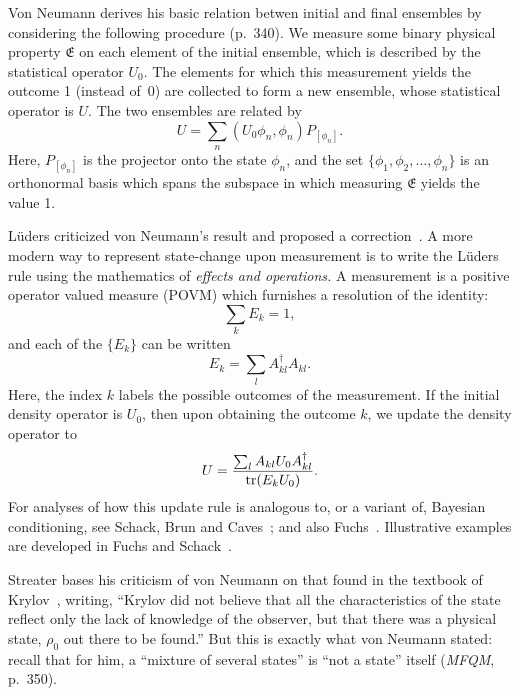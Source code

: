 \documentclass[aps,pra,superscriptaddress,12pt,tightenlines,nofootinbib]{revtex4-2}
\newcommand{\tr}{\hbox{tr}}
\newcommand{\MFQM}{\textsl{MFQM}}
\begin{document}
Von Neumann derives his basic relation betwen initial and final
ensembles by considering the following procedure (p.\ 340).  We
measure some binary physical property $\mathfrak{E}$ on each element of the
initial ensemble, which is described by the statistical operator $U_0$.
The elements for which this measurement yields the outcome 1 (instead
of~0) are collected to form a new ensemble, whose statistical operator
is $U$.  The two ensembles are related by
\begin{equation}
U = \sum_n (U_0 \phi_n, \phi_n) P_{[\phi_n]}.
\end{equation}
Here, $P_{[\phi_n]}$ is the projector onto the state $\phi_n$, and the
set $\{\phi_1,\phi_2,\ldots,\phi_n\}$ is an orthonormal basis which
spans the subspace in which measuring $\mathfrak{E}$ yields the value 1.

L\"uders criticized von Neumann's result and proposed a
correction~\cite{Lueders1951}.  A more modern way to represent
state-change upon measurement is to write the L\"uders rule using the
mathematics of \emph{effects and operations.}  A measurement is a
positive operator valued measure (POVM) which furnishes a resolution
of the identity:
\begin{equation}
\sum_k E_k = 1,
\end{equation}
and each of the $\{E_k\}$ can be written
\begin{equation}
E_k = \sum_l A^\dag_{kl} A_{kl}.
\end{equation}
Here, the index $k$ labels the possible outcomes of the measurement.
If the initial density operator is $U_0$, then upon obtaining the
outcome $k$, we update the density operator to
\begin{equation}
U = \frac{\sum_l A_{kl} U_0 A^\dag_{kl}}
         {\tr(E_k U_0)}.
\end{equation}
For analyses of how this update rule is analogous to, or a variant of,
Bayesian conditioning, see Schack, Brun and Caves~\cite{Schack2001};
and also Fuchs~\cite{Fuchs2002}.  Illustrative examples are developed
in Fuchs and Schack~\cite{Fuchs2009}.

Streater bases his criticism of von Neumann on that found in the
textbook of Krylov~\cite{Krylov1979}, writing, ``Krylov did not
believe that all the characteristics of the state reflect only the
lack of knowledge of the observer, but that there was a physical
state, $\rho_0$ out there to be found.''  But this is exactly what von
Neumann stated: recall that for him, a ``mixture of several states''
is ``not a state'' itself (\MFQM, p.\ 350).
\end{document}
